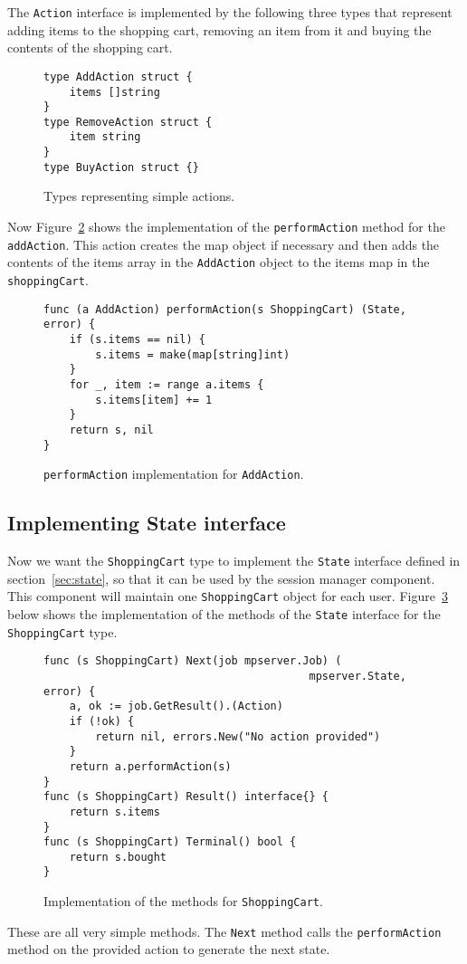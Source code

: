 The \texttt{Action} interface is implemented by the following three types
that represent adding items to the shopping cart, removing an item from it
and buying the contents of the shopping cart.
\begin{figure}[h]
\begin{lstlisting}
type AddAction struct {
    items []string
}
type RemoveAction struct {
    item string
}
type BuyAction struct {}
\end{lstlisting}
\caption[scale=1.0]{Types representing simple actions.}
\label{fig:actions}
\end{figure}

Now Figure~\ref{fig:addAction} shows the implementation of the \texttt{performAction}
method for the \texttt{addAction}. This action creates the map object if 
necessary and then adds the contents of the items array in the \texttt{AddAction}
object to the items map in the \texttt{shoppingCart}.
\begin{figure}[h]
\begin{lstlisting}
func (a AddAction) performAction(s ShoppingCart) (State, error) {
    if (s.items == nil) {
        s.items = make(map[string]int)
    }
    for _, item := range a.items {
        s.items[item] += 1
    }
    return s, nil
}
\end{lstlisting}
\caption[scale=1.0]{\texttt{performAction} implementation for \texttt{AddAction}.}
\label{fig:addAction}
\end{figure}

\subsection{Implementing State interface}
Now we want the \texttt{ShoppingCart} type to implement the \texttt{State} 
interface defined in section~\ref{sec:state}, 
so that it can be used by the session manager component.
This component will maintain one \texttt{ShoppingCart} object for each user.
Figure~\ref{fig:shoppingCartImpl} below shows the implementation of the 
methods of the \texttt{State} interface for the \texttt{ShoppingCart} type.
\begin{figure}[h]
\begin{lstlisting}
func (s ShoppingCart) Next(job mpserver.Job) (
                                         mpserver.State, error) {
    a, ok := job.GetResult().(Action)
    if (!ok) {
        return nil, errors.New("No action provided")
    }
    return a.performAction(s)
}
func (s ShoppingCart) Result() interface{} {
    return s.items
}
func (s ShoppingCart) Terminal() bool {
    return s.bought
}
\end{lstlisting}
\caption[scale=1.0]{Implementation of the methods for \texttt{ShoppingCart}.}
\label{fig:shoppingCartImpl}
\end{figure}
These are all very simple methods. The \texttt{Next} method calls 
the \texttt{performAction} method on the provided action to generate 
the next state.

